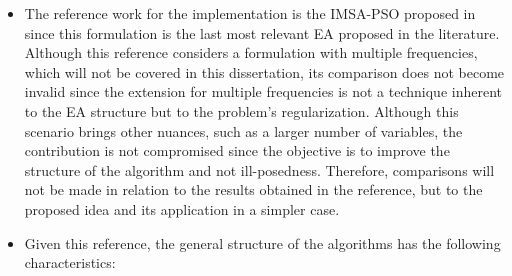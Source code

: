 			\begin{itemize}
				\item The reference work for the implementation is the IMSA-PSO proposed in \citep{salucci2017multifrequency} since this formulation is the last most relevant EA proposed in the literature. Although this reference considers a formulation with multiple frequencies, which will not be covered in this dissertation, its comparison does not become invalid since the extension for multiple frequencies is not a technique inherent to the EA structure but to the problem's regularization. Although this scenario brings other nuances, such as a larger number of variables, the contribution is not compromised since the objective is to improve the structure of the algorithm and not ill-posedness. Therefore, comparisons will not be made in relation to the results obtained in the reference, but to the proposed idea and its application in a simpler case.
				\item Given this reference, the general structure of the algorithms has the following characteristics:
				\begin{itemize}

\end{itemize}
\end{itemize}

